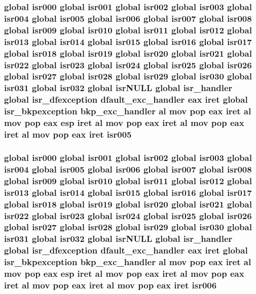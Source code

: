 \subsubsection[{\texorpdfstring{isr005}{isr005}}]{\setlength{\rightskip}{0pt plus 5cm}global {\bf isr000} global {\bf isr001} global {\bf isr002} global {\bf isr003} global {\bf isr004} global isr005 global {\bf isr006} global {\bf isr007} global {\bf isr008} global {\bf isr009} global {\bf isr010} global {\bf isr011} global {\bf isr012} global {\bf isr013} global {\bf isr014} global {\bf isr015} global {\bf isr016} global {\bf isr017} global {\bf isr018} global {\bf isr019} global {\bf isr020} global {\bf isr021} global {\bf isr022} global {\bf isr023} global {\bf isr024} global {\bf isr025} global {\bf isr026} global {\bf isr027} global {\bf isr028} global {\bf isr029} global {\bf isr030} global {\bf isr031} global isr032 global isr\+N\+U\+LL global isr\+\_\+handler global {\bf isr\+\_\+dfexception} {\bf dfault\+\_\+exc\+\_\+handler} eax iret global {\bf isr\+\_\+bkpexception} {\bf bkp\+\_\+exc\+\_\+handler} {\bf al} {\bf mov} pop eax iret {\bf al} {\bf mov} pop eax esp iret {\bf al} {\bf mov} pop eax iret {\bf al} {\bf mov} pop eax iret {\bf al} {\bf mov} pop eax iret isr005}\hypertarget{isrs_8as_acef12f5780627c69e01e74a03a53ab36}{}\label{isrs_8as_acef12f5780627c69e01e74a03a53ab36}
\subsubsection[{\texorpdfstring{isr006}{isr006}}]{\setlength{\rightskip}{0pt plus 5cm}global {\bf isr000} global {\bf isr001} global {\bf isr002} global {\bf isr003} global {\bf isr004} global {\bf isr005} global isr006 global {\bf isr007} global {\bf isr008} global {\bf isr009} global {\bf isr010} global {\bf isr011} global {\bf isr012} global {\bf isr013} global {\bf isr014} global {\bf isr015} global {\bf isr016} global {\bf isr017} global {\bf isr018} global {\bf isr019} global {\bf isr020} global {\bf isr021} global {\bf isr022} global {\bf isr023} global {\bf isr024} global {\bf isr025} global {\bf isr026} global {\bf isr027} global {\bf isr028} global {\bf isr029} global {\bf isr030} global {\bf isr031} global isr032 global isr\+N\+U\+LL global isr\+\_\+handler global {\bf isr\+\_\+dfexception} {\bf dfault\+\_\+exc\+\_\+handler} eax iret global {\bf isr\+\_\+bkpexception} {\bf bkp\+\_\+exc\+\_\+handler} {\bf al} {\bf mov} pop eax iret {\bf al} {\bf mov} pop eax esp iret {\bf al} {\bf mov} pop eax iret {\bf al} {\bf mov} pop eax iret {\bf al} {\bf mov} pop eax iret {\bf al} {\bf mov} pop eax iret isr006}\hypertarget{isrs_8as_a57f06c427c140a959f4c34d954e3cfae}{}\label{isrs_8as_a57f06c427c140a959f4c34d954e3cfae}
